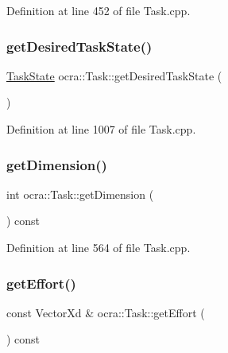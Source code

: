 Definition at line 452 of file Task.\+cpp.

\hypertarget{classocra_1_1Task_a22cb1cd88dda7477d2594b9851f86301}{}\label{classocra_1_1Task_a22cb1cd88dda7477d2594b9851f86301} 
\subsubsection{\texorpdfstring{get\+Desired\+Task\+State()}{getDesiredTaskState()}}
{\footnotesize\ttfamily \hyperlink{classocra_1_1TaskState}{Task\+State} ocra\+::\+Task\+::get\+Desired\+Task\+State (\begin{DoxyParamCaption}{ }\end{DoxyParamCaption})}



Definition at line 1007 of file Task.\+cpp.

\hypertarget{classocra_1_1Task_a12b60082f3f87274db964b7844af816e}{}\label{classocra_1_1Task_a12b60082f3f87274db964b7844af816e} 
\subsubsection{\texorpdfstring{get\+Dimension()}{getDimension()}}
{\footnotesize\ttfamily int ocra\+::\+Task\+::get\+Dimension (\begin{DoxyParamCaption}{ }\end{DoxyParamCaption}) const}



Definition at line 564 of file Task.\+cpp.

\hypertarget{classocra_1_1Task_abd81ebbd3029da1cf9581c52d25aa4fc}{}\label{classocra_1_1Task_abd81ebbd3029da1cf9581c52d25aa4fc} 
\subsubsection{\texorpdfstring{get\+Effort()}{getEffort()}}
{\footnotesize\ttfamily const Vector\+Xd \& ocra\+::\+Task\+::get\+Effort (\begin{DoxyParamCaption}{ }\end{DoxyParamCaption}) const}



